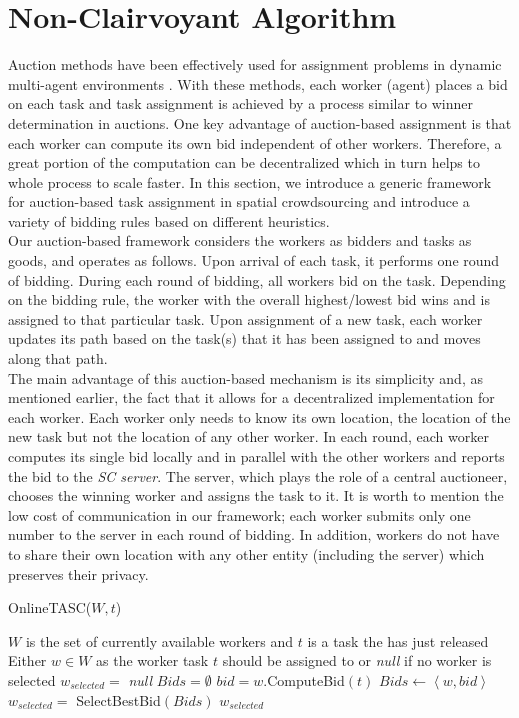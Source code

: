 \section{Non-Clairvoyant Algorithm}
\label{sec:onlinealgo}

Auction methods have been effectively used for assignment problems in dynamic multi-agent environments \cite{Mehta05,Lagoudakis04}. With these methods, each worker (agent) places a bid on each task and task assignment is achieved by a process similar to winner determination in auctions. One key advantage of auction-based assignment is that each worker can compute its own bid independent of other workers. Therefore, a great portion of the computation can be decentralized which in turn helps to whole process to scale faster. In this section, we introduce a generic framework for auction-based task assignment in spatial crowdsourcing and introduce a variety of bidding rules based on different heuristics.\\

Our auction-based framework considers the workers as bidders and tasks as goods, and operates as follows. Upon arrival of each task, it performs one round of bidding. During each round of bidding, all workers bid on the task. Depending on the bidding rule, the worker with the overall highest/lowest bid wins and is assigned to that particular task. Upon assignment of a new task, each worker updates its path based on the task(s) that it has been assigned to and moves along that path.\\

The main advantage of this auction-based mechanism is its simplicity and, as mentioned earlier, the fact that it allows for a decentralized implementation for each worker. Each worker only needs to know its own location, the location of the new task but not the location of any other worker. In each round, each worker computes its single bid locally and in parallel with the other workers and reports the bid to the \textit{SC server}. The server, which plays the role of a central auctioneer, chooses the winning worker and assigns the task to it. It is worth to mention the low cost of communication in our framework; each worker submits only one number to the server in each round of bidding. In addition, workers do not have to share their own location with any other entity (including the server) which preserves their privacy.\\

\begin{algorithm}
\caption{OnlineTASC($W, t$)}
\label{algo:OnlineTASC}
\begin{algorithmic}[1]
\REQUIRE $W$ is the set of currently available workers and $t$ is a task the has just released
\ENSURE Either $w \in W$ as the worker task $t$ should be assigned to or \emph{null} if no worker is selected
\STATE $w_{selected} = $ \emph{null}
\STATE $Bids = \emptyset$
	\STATE $bid = w$.ComputeBid$(t)$
	\STATE $Bids \leftarrow \left\langle w, bid \right\rangle$
\ENDFOR
\STATE $w_{selected} = $ SelectBestBid$(Bids)$
\RETURN $w_{selected}$
\end{algorithmic}
\end{algorithm}

